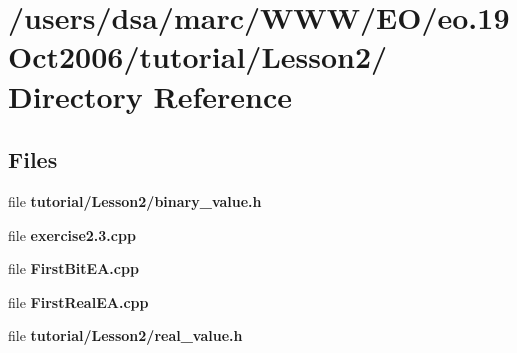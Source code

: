 \section{/users/dsa/marc/WWW/EO/eo.19Oct2006/tutorial/Lesson2/ Directory Reference}
\label{dir_000004}
\subsection*{Files}
\begin{CompactItemize}
\item 
file {\bf tutorial/Lesson2/binary_value.h}
\item 
file {\bf exercise2.3.cpp}
\item 
file {\bf FirstBitEA.cpp}
\item 
file {\bf FirstRealEA.cpp}
\item 
file {\bf tutorial/Lesson2/real_value.h}
\end{CompactItemize}
